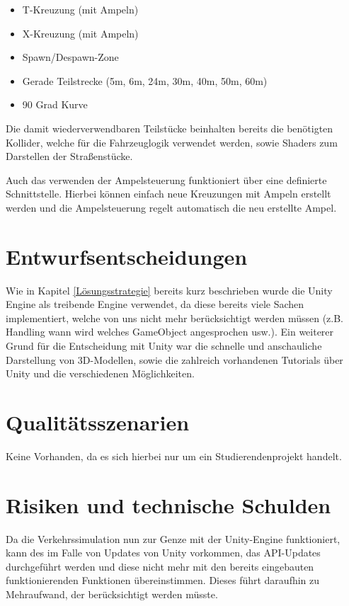 \begin{itemize}  
\item T-Kreuzung (mit Ampeln)
\item X-Kreuzung (mit Ampeln)
\item Spawn/Despawn-Zone
\item Gerade Teilstrecke (5m, 6m, 24m, 30m, 40m, 50m, 60m)
\item 90 Grad Kurve
\end{itemize}

Die damit wiederverwendbaren Teilstücke beinhalten bereits die benötigten Kollider, welche für die Fahrzeuglogik verwendet werden, sowie Shaders zum Darstellen der Straßenstücke.

Auch das verwenden der Ampelsteuerung funktioniert über eine definierte Schnittstelle. Hierbei können einfach neue Kreuzungen mit Ampeln erstellt werden und die Ampelsteuerung regelt automatisch die neu erstellte Ampel.

\section{Entwurfsentscheidungen}
\label{Entwurfsentscheidungen}

Wie in Kapitel \ref{Lösungsstrategie} bereits kurz beschrieben wurde die Unity Engine als treibende Engine verwendet, da diese bereits viele Sachen implementiert, welche von uns nicht mehr berücksichtigt werden müssen (z.B. Handling wann wird welches GameObject angesprochen usw.). Ein weiterer Grund für die Entscheidung mit Unity war die schnelle und anschauliche Darstellung von 3D-Modellen, sowie die zahlreich vorhandenen Tutorials über Unity und die verschiedenen Möglichkeiten.

\section{Qualitätsszenarien}
\label{Qualitätsszenarien}

Keine Vorhanden, da es sich hierbei nur um ein Studierendenprojekt handelt.

\section{Risiken und technische Schulden}
\label{Risiken und technische Schulden}

Da die Verkehrssimulation nun zur Genze mit der Unity-Engine funktioniert, kann des im Falle von Updates von Unity vorkommen, das API-Updates durchgeführt werden und diese nicht mehr mit den bereits eingebauten funktionierenden Funktionen übereinstimmen. Dieses führt daraufhin zu Mehraufwand, der berücksichtigt werden müsste.